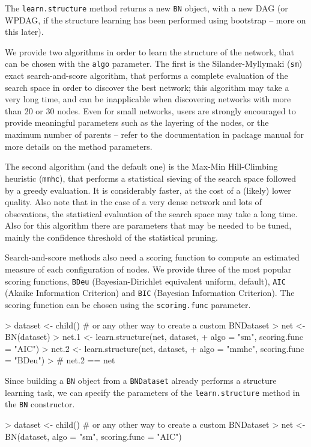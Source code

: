 \documentclass{article}
\newcommand{\Robject}[1]{{\texttt{#1}}}
\newcommand{\Rmethod}[1]{{\texttt{#1}}}
\begin{document}
The \Rmethod{learn.structure} method returns a new \Robject{BN} object, with a new DAG (or WPDAG, if the structure
learning has been performed using bootstrap -- more on this later).

We provide two algorithms in order to learn the structure of the network, that can be chosen with the \texttt{algo} parameter.
The first is the Silander-Myllymaki (\texttt{sm})
exact search-and-score algorithm, that performs a complete evaluation of the search space in order to discover
the best network; this algorithm may take a very long time, and can be inapplicable when discovering networks
with more than 20 or 30 nodes. Even for small networks, users are strongly encouraged to provide
meaningful parameters such as the layering of the nodes, or the maximum number of parents -- refer to the 
documentation in package manual for more details on the method parameters.

The second algorithm (and the default one) is the Max-Min Hill-Climbing heuristic (\texttt{mmhc}), that performs a statistical
sieving of the search space followed by a greedy evaluation. It is considerably faster, at the cost of a (likely)
lower quality. Also note that in the case of a very dense network and lots of obsevations, the statistical evaluation
of the search space may take a long time. Also for this algorithm there are parameters that may be needed to be tuned,
mainly the confidence threshold of the statistical pruning.

Search-and-score methods also need a scoring function to compute an estimated measure of each configuration of nodes.
We provide three of the most popular scoring functions, \texttt{BDeu} (Bayesian-Dirichlet equivalent uniform, default),
\texttt{AIC} (Akaike Information Criterion) and \texttt{BIC} (Bayesian Information Criterion). The scoring function
can be chosen using the \texttt{scoring.func} parameter.

\begin{Schunk}
\begin{Sinput}
> dataset <- child() # or any other way to create a custom BNDataset
> net     <- BN(dataset)
> net.1   <- learn.structure(net, dataset,
+                            algo = "sm", scoring.func = "AIC")
> net.2   <- learn.structure(net, dataset,
+                            algo = "mmhc", scoring.func = "BDeu")
> # net.2 == net
\end{Sinput}
\end{Schunk}

Since building a \Robject{BN} object from a \Robject{BNDataset} already performs a structure learning task,
we can specify the parameters of the \Rmethod{learn.structure} method in the \Rmethod{BN} constructor.
\begin{Schunk}
\begin{Sinput}
> dataset <- child() # or any other way to create a custom BNDataset
> net     <- BN(dataset, algo = "sm", scoring.func = "AIC")
\end{Sinput}
\end{Schunk}
\end{document}
